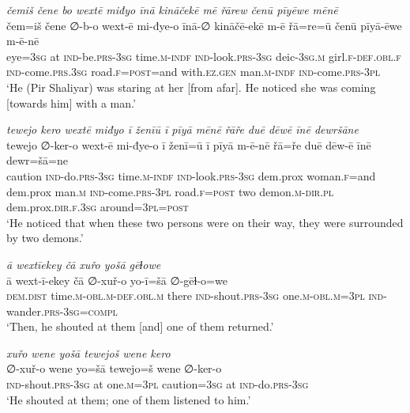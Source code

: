 \ea \label{ZP.66}
\textit{čemiš čene bo wextē miđyo īnā kināčekē mē řārew čenū pīyēwe mēnē} \\ 
\gll čem=iš čene ∅-b-o wext-ē mi-đye-o īnā-∅ kināčē-ekē m-ē řā=re=ū čenū pīyā-ēwe m-ē-nē \\ 
 eye\textsc{=3sg} at \textsc{ind-}be\textsc{.prs}\textsc{-3sg} time\textsc{.m}\textsc{-indf} \textsc{ind-}look\textsc{.prs}\textsc{-3sg} deic\textsc{-3sg}\textsc{.m} girl\textsc{.f}\textsc{-def}\textsc{.obl}\textsc{.f} \textsc{ind-}come\textsc{.prs}\textsc{.3sg} road\textsc{.f}\textsc{=\textsc{post}}=and with\textsc{.ez.gen} man\textsc{.m}\textsc{-indf} \textsc{ind-}come\textsc{.prs}\textsc{-3pl} \\ 
\glt `He (Pir Shaliyar) was staring at her [from afar]. He noticed she was coming [towards him] with a man.'
\z 
 
\ea \label{ZP.67}
\textit{tewejo kero wextē miđyo ī ženīū ī pīyā mēnē řāře duē dēwē īnē dewršāne} \\ 
\gll tewejo ∅-ker-o wext-ē mi-đye-o ī ženī=ū ī pīyā m-ē-nē řā=ře duē dēw-ē īnē dewr=šā=ne \\ 
 caution \textsc{ind-}do\textsc{.prs}\textsc{-3sg} time\textsc{.m}\textsc{-indf} \textsc{ind-}look\textsc{.prs}\textsc{-3sg} dem.prox woman\textsc{.f}=and dem.prox man\textsc{.m} \textsc{ind-}come\textsc{.prs}\textsc{-3pl} road\textsc{.f}\textsc{=\textsc{post}} two demon\textsc{.m}\textsc{-dir}\textsc{.pl} dem.prox\textsc{.dir}\textsc{.f}\textsc{.3sg} around\textsc{=3pl}\textsc{=\textsc{post}} \\ 
\glt `He noticed that when these two persons were on their way, they were surrounded by two demons.'
\z 
 
\ea \label{ZP.68}
\textit{ā wextīekey čā xuřo yošā gēɫowe} \\ 
\gll ā wext-ī-ekey čā ∅-xuř-o yo-ī=šā ∅-gēɫ-o=we \\ 
 \textsc{dem.dist} time\textsc{.m}\textsc{-obl}\textsc{.m}\textsc{-def}\textsc{.obl}\textsc{.m} there \textsc{ind-}shout\textsc{.prs}\textsc{-3sg} one\textsc{.m}\textsc{-obl}\textsc{.m}\textsc{=3pl} \textsc{ind-}wander\textsc{.prs}\textsc{-3sg}\textsc{=compl} \\ 
\glt `Then, he shouted at them [and] one of them returned.'
\z 
 
\ea \label{ZP.69}
\textit{xuřo wene yošā tewejoš wene kero} \\ 
\gll ∅-xuř-o wene yo=šā tewejo=š wene ∅-ker-o \\ 
 \textsc{ind-}shout\textsc{.prs}\textsc{-3sg} at one\textsc{.m}\textsc{=3pl} caution\textsc{=3sg} at \textsc{ind-}do\textsc{.prs}\textsc{-3sg} \\ 
\glt `He shouted at them; one of them listened to him.'
\z 
 
